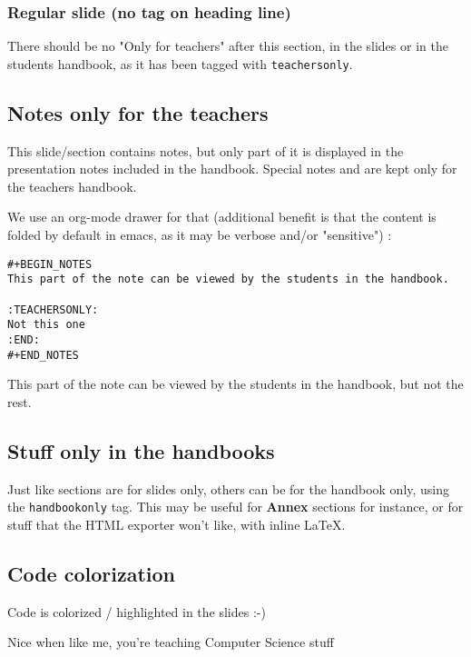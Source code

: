 \documentclass[a4paper]{article}
\begin{document}
\subsubsection{Regular slide (no tag on heading line)}
\label{sec:org46bb8f7}

There should be no "Only for teachers" after this section, in the slides or in the
students handbook, as it has been tagged with \texttt{teachersonly}.

\subsection{Notes only for the teachers}
\label{sec:orgf6aa41d}

This slide/section contains notes, but only part of it is displayed in
the presentation notes included in the handbook. Special notes and are
kept only for the teachers handbook.

We use an org-mode drawer for that (additional benefit is that the content is folded by default in emacs, as it may be verbose and/or "sensitive") :
\begin{verbatim}
#+BEGIN_NOTES
This part of the note can be viewed by the students in the handbook.

:TEACHERSONLY:
Not this one
:END:
#+END_NOTES
\end{verbatim}

\begin{NOTES}


This part of the note can be viewed by the students in the handbook,
but not the rest.
\end{NOTES}

\subsection{Stuff only in the handbooks}
\label{sec:org1cbc2c2}

Just like sections are for slides only, others can be for the handbook
only, using the \texttt{handbookonly} tag. This may be useful for \textbf{Annex}
sections for instance, or for stuff that the HTML exporter won't like, with inline \LaTeX{}.

\subsection{Code colorization}
\label{sec:org750a11d}
Code is colorized / highlighted in the slides :-)

\begin{NOTES}
Nice when like me, you're teaching Computer Science stuff
\end{NOTES}
\end{document}

